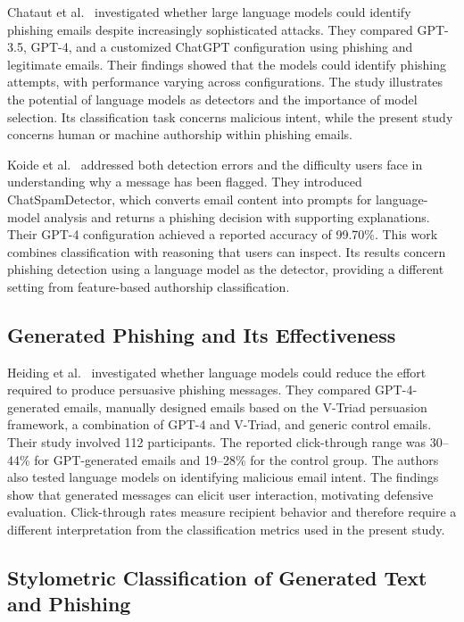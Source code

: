 \documentclass[conference]{IEEEtran}
\begin{document}
Chataut et al.~\cite{chataut2024} investigated whether large language
models could identify phishing emails despite increasingly sophisticated
attacks. They compared GPT-3.5, GPT-4, and a customized ChatGPT
configuration using phishing and legitimate emails. Their findings
showed that the models could identify phishing attempts, with performance
varying across configurations. The study illustrates the potential of
language models as detectors and the importance of model selection.
Its classification task concerns malicious intent, while the present
study concerns human or machine authorship within phishing emails.

Koide et al.~\cite{koide2026} addressed both detection errors and the
difficulty users face in understanding why a message has been flagged.
They introduced ChatSpamDetector, which converts email content into
prompts for language-model analysis and returns a phishing decision
with supporting explanations. Their GPT-4 configuration achieved a
reported accuracy of 99.70\%. This work combines classification with
reasoning that users can inspect. Its results concern phishing detection
using a language model as the detector, providing a different setting
from feature-based authorship classification.

\subsection{Generated Phishing and Its Effectiveness}

Heiding et al.~\cite{heiding2024} investigated whether language models
could reduce the effort required to produce persuasive phishing
messages. They compared GPT-4-generated emails, manually designed
emails based on the V-Triad persuasion framework, a combination of
GPT-4 and V-Triad, and generic control emails. Their study involved
112 participants. The reported click-through range was 30--44\% for
GPT-generated emails and 19--28\% for the control group. The authors
also tested language models on identifying malicious email intent.
The findings show that generated messages can elicit user interaction,
motivating defensive evaluation. Click-through rates measure recipient
behavior and therefore require a different interpretation from the
classification metrics used in the present study.

\subsection{Stylometric Classification of Generated Text and Phishing}
\end{document}

